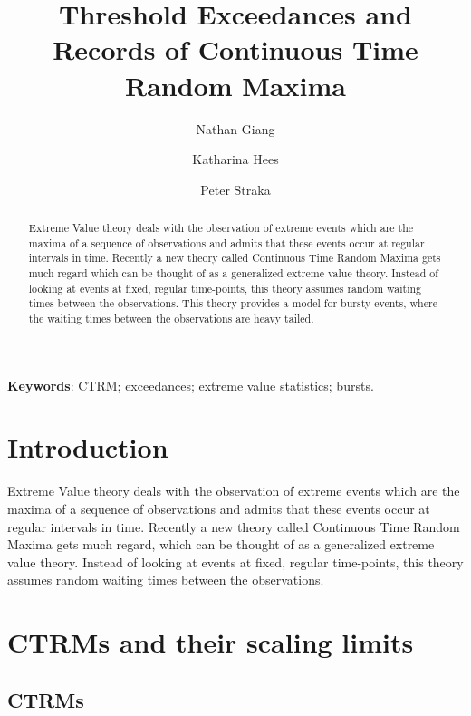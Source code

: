 \documentclass[12pt, a4paper]{article}
\title{Threshold Exceedances and Records of Continuous Time Random Maxima}
\author{Nathan Giang \and Katharina Hees \and Peter Straka}
\newcommand{\1}{\mathbf 1}
\begin{document}
\maketitle

\begin{abstract}
Extreme Value theory deals with the observation of extreme events which are the maxima of a sequence of observations and admits that these events occur at regular intervals in time. Recently a new theory called Continuous Time Random Maxima gets much regard which can be thought of as a generalized extreme value theory. Instead of looking at events at fixed, regular time-points, this theory assumes random waiting times between the observations. This theory provides a model for bursty events, where the waiting times between the observations are heavy tailed.

\end{abstract}

{\bf Keywords}: CTRM; exceedances; extreme value statistics; bursts.


\setlength{\parindent}{0pt}

\section{Introduction}
Extreme Value theory deals with the observation of extreme events which are the maxima of a sequence of observations and admits that these events occur at regular intervals in time. Recently a new theory called Continuous Time Random Maxima gets much regard, which can be thought of as a generalized extreme value theory. Instead of looking at events at fixed, regular time-points, this theory assumes random waiting times between the observations.


\section{CTRMs and their scaling limits}

\subsection{CTRMs}
\end{document}

